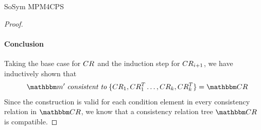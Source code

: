\begin{copiedFrom}{SoSym MPM4CPS}
\begin{proof}
    \paragraph{Conclusion}
    Taking the base case for $CR_{}$ and the induction step for $CR_{i+1}$, we have inductively shown that 
    \begin{align*}
        \formulaskip 
        \modelset{m'} \consistenttomath \setted{\consistencyrelation{CR}{1}, \consistencyrelation{CR^T}{1} \dots, \consistencyrelation{CR}{k}, \consistencyrelation{CR^T}{k}} = \consistencyrelationset{CR}
    \end{align*}
    Since the construction is valid for each condition element in every consistency relation in $\consistencyrelationset{CR}$, we know that a consistency relation tree $\consistencyrelationset{CR}$ is compatible.

\end{proof}
\end{copiedFrom}
